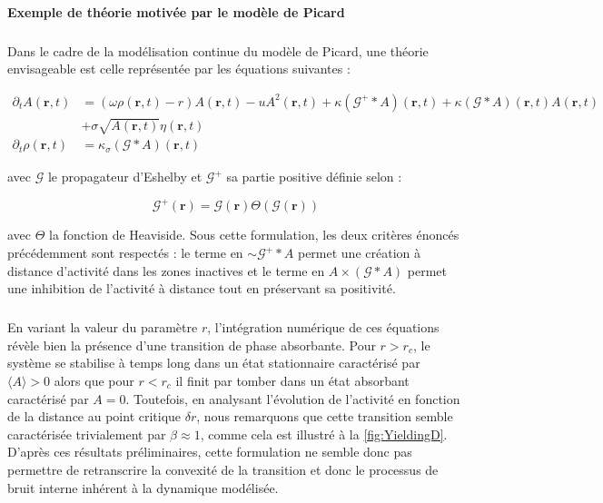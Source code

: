 \paragraph{Exemple de théorie motivée par le modèle de Picard}

\subparagraph{}Dans le cadre de la modélisation continue du modèle de Picard, une théorie envisageable est celle représentée par les équations suivantes :

\begin{equation}
    \begin{aligned}
        \partial_t A (\mathbf{r}, t) &= \left(\omega \rho (\mathbf{r}, t)-r\right) A (\mathbf{r}, t) - uA^2 (\mathbf{r}, t) + \kappa \left(\mathcal{G}^+\ast A \right)(\mathbf{r}, t) + \kappa\left(\mathcal{G}\ast A \right)(\mathbf{r}, t)A (\mathbf{r}, t) \\
        &+\sigma \sqrt{A (\mathbf{r}, t)}\eta(\mathbf{r}, t)\\
        \partial_t \rho (\mathbf{r}, t) &= \kappa_\sigma \left(\mathcal{G}\ast A \right)(\mathbf{r}, t)
    \end{aligned}
\label{eq:YieldingD}
\end{equation}

\noindent avec $\mathcal{G}$ le propagateur d'Eshelby et $\mathcal{G}^+$ sa partie positive définie selon :

\begin{equation}
	\mathcal{G}^+(\mathbf{r}) = \mathcal{G}(\mathbf{r})\Theta\left(\mathcal{G}(\mathbf{r})\right)
\end{equation}

\noindent avec $\Theta$ la fonction de Heaviside. Sous cette formulation, les deux critères énoncés précédemment sont respectés : le terme en $\sim \mathcal{G}^+\ast A$ permet une création à distance d'activité dans les zones inactives et le terme en $A\times (\mathcal{G}\ast A)$ permet une inhibition de l'activité à distance tout en préservant sa positivité.

\subparagraph{}En variant la valeur du paramètre $r$, l'intégration numérique de ces équations révèle bien la présence d'une transition de phase absorbante. Pour $r>r_c$, le système se stabilise à temps long dans un état stationnaire caractérisé par $\langle A \rangle > 0$ alors que pour $r<r_c$ il finit par tomber dans un état absorbant caractérisé par $A = 0$. Toutefois, en analysant l'évolution de l'activité en fonction de la distance au point critique $\delta r$, nous remarquons que cette transition semble caractérisée trivialement par $\beta \approx 1$, comme cela est illustré à la \autoref{fig:YieldingD}. D'après ces résultats préliminaires, cette formulation ne semble donc pas permettre de retranscrire la convexité de la transition et donc le processus de bruit interne inhérent à la dynamique modélisée.

